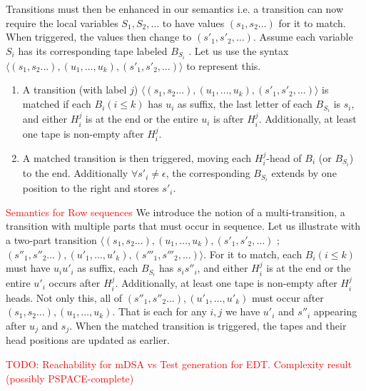 Transitions must then be enhanced in our semantics i.e. a transition can now require the local variables $S_1, S_2,\dots$ to have values $(s_1, s_2 \dots)$  for it to match. When triggered, the values then change to $(s'_1,s'_2,\dots)$. Assume each variable $S_i$ has its corresponding tape labeled $B_{S_i}$%
. Let us use the syntax $\langle (s_1, s_2 \dots), (u_1, \dots, u_k), (s'_1,s'_2,\dots) \rangle$ to represent this.

\begin{enumerate}
\item A transition (with label $j$) $\langle (s_1, s_2 \dots), (u_1, \dots, u_k), (s'_1,s'_2,\dots) \rangle$ is matched if each $B_i (i\le k)$ has $u_i$ as suffix, the last letter of each $B_{S_i}$ is $s_i$, and either $H_{i}^{j}$ is at the end or the entire $u_i$ is after $H_{i}^{j}$. Additionally, at least one tape is non-empty after $H_{i}^{j}$.

\item A matched transition is then triggered, moving each $H_{i}^{j}$-head of $B_i$ (or $B_{S_i}$) to the end. Additionally $\forall s'_i \ne \epsilon$, the corresponding $B_{S_i}$ extends by one position to the right and stores $s'_i$.
\end{enumerate}

\textcolor{red}{Semantics for Row sequences}
We introduce the notion of a multi-transition, a transition with multiple parts that must occur in sequence. Let us illustrate with a two-part transition $\langle (s_1, s_2 \dots), (u_1, \dots, u_k), (s'_1,s'_2,\dots)$ ; $(s''_1, s''_2 \dots), (u'_1, \dots, u'_k), (s'''_1,s'''_2,\dots) \rangle$. For it to match, each $B_i (i\le k)$ must have $u_i  u'_i$ as suffix, each $B_{S_i}$ has $s_i  s''_i$, and either $H_{i}^{j}$ is at the end or the entire $u'_i$ occurs after $H_i^j$. Additionally, at least one tape is non-empty after $H_i^j$ heads. Not only this, all of $(s''_1, s''_2 \dots), (u'_1, \dots, u'_k)$ must occur after $(s_1, s_2 \dots), (u_1, \dots, u_k)$. That is each for any $i,j$ we have $u'_i$ and $s''_i$ appearing after $u_j$ and $s_j$. When the matched transition is triggered, the tapes and their head positions are updated as earlier.

\textcolor{red}{TODO: Reachability for mDSA vs Test generation for EDT. Complexity result (possibly PSPACE-complete)}

%


